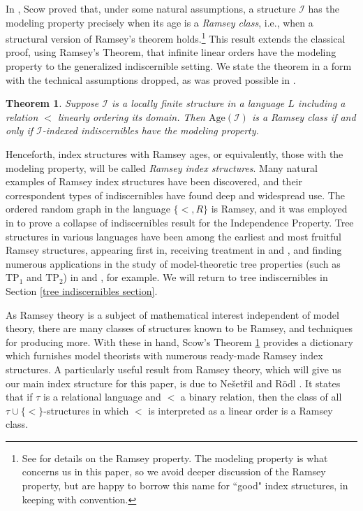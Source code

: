 \documentclass{article}
\newcommand{\calI}{\mathcal{I}}
\newcommand{\TPi}{\text{TP}_1}
\newcommand{\TPii}{\text{TP}_2}
\newcommand{\Age}{\text{Age}}
\newtheorem{theorem}{Theorem}
\theoremstyle{definition}
\theoremstyle{definition}
\theoremstyle{definition}
\theoremstyle{definition}
\begin{document}
In \cite{scow_characterization_2011}, Scow proved that, under some natural assumptions, a structure $\calI$ has the modeling property precisely when its age is a \textit{Ramsey class}, i.e., when a structural version of Ramsey's theorem holds.\footnote{See \cite{Kim_Kim_Scow_2013} for details on the Ramsey property. The modeling property is what concerns us in this paper, so we avoid deeper discussion of the Ramsey property, but are happy to borrow this name for ``good" index structures, in keeping with convention.} This result extends the classical proof, using Ramsey's Theorem, that infinite linear orders have the modeling property to the generalized indiscernible setting. We state the theorem in a form with the technical assumptions dropped, as was proved possible in \cite{meir_popadopoulos_2022practical}.

\begin{theorem}\label{Scow's theorem}
Suppose $\calI$ is a  
locally finite structure in a language $L$ including a relation $<$ linearly ordering its domain. Then  $\Age(\calI)$ is a Ramsey class if and only if $\calI$-indexed indiscernibles have the modeling property.    
\end{theorem}

Henceforth, index structures with Ramsey ages, or equivalently, those with the modeling property, will be called \textit{Ramsey index structures}. Many natural examples of Ramsey index structures have been discovered, and their correspondent types of indiscernibles have found deep and widespread use. The ordered random graph in the language $\{<, R\}$ is Ramsey, and it was employed in \cite{SCOW_2012_NIP} to prove a collapse of indiscernibles result for the Independence Property. Tree structures in various languages have been among the earliest and most fruitful Ramsey structures, appearing first in\cite{shelah_classification_1990}, receiving treatment in \cite{Kim_Kim_Scow_2013} and \cite{TAKEUCHI_Tsuboi_2012}, and finding numerous applications in the study of model-theoretic tree properties (such as $\TPi$ and $\TPii$) in \cite{Chernikov_Ramsey_2016} and \cite{Kaplan_Ramsey_2017}, for example. We will return to tree indiscernibles in Section \ref{tree indiscernibles section}.

As Ramsey theory is a subject of mathematical interest independent of model theory, there are many classes of structures known to be Ramsey, and techniques for producing more. With these in hand, Scow's Theorem \ref{Scow's theorem} provides a dictionary which furnishes model theorists with numerous ready-made Ramsey index structures. A particularly useful result from Ramsey theory, which will give us our main index structure for this paper, is due to Ne\v set\v ril and R\"odl \cite{NESETRIL_Rodl_1983}. It states that if $\tau$ is a relational language and $<$ a binary relation, then the class of all $\tau\cup\{<\}$-structures in which $<$ is interpreted as a linear order is a Ramsey class.
\end{document}
